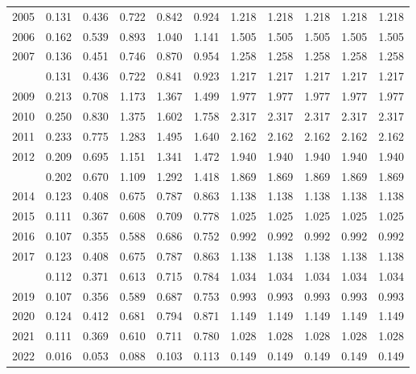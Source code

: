 \documentclass[
]{article}
\begin{document}
\begin{longtable}[t]{lrrrrrrrrrr}
2005 & 0.131 & 0.436 & 0.722 & 0.842 & 0.924 & 1.218 & 1.218 & 1.218 & 1.218 & 1.218\\
2006 & 0.162 & 0.539 & 0.893 & 1.040 & 1.141 & 1.505 & 1.505 & 1.505 & 1.505 & 1.505\\
2007 & 0.136 & 0.451 & 0.746 & 0.870 & 0.954 & 1.258 & 1.258 & 1.258 & 1.258 & 1.258\\
\addlinespace
2008 & 0.131 & 0.436 & 0.722 & 0.841 & 0.923 & 1.217 & 1.217 & 1.217 & 1.217 & 1.217\\
2009 & 0.213 & 0.708 & 1.173 & 1.367 & 1.499 & 1.977 & 1.977 & 1.977 & 1.977 & 1.977\\
2010 & 0.250 & 0.830 & 1.375 & 1.602 & 1.758 & 2.317 & 2.317 & 2.317 & 2.317 & 2.317\\
2011 & 0.233 & 0.775 & 1.283 & 1.495 & 1.640 & 2.162 & 2.162 & 2.162 & 2.162 & 2.162\\
2012 & 0.209 & 0.695 & 1.151 & 1.341 & 1.472 & 1.940 & 1.940 & 1.940 & 1.940 & 1.940\\
\addlinespace
2013 & 0.202 & 0.670 & 1.109 & 1.292 & 1.418 & 1.869 & 1.869 & 1.869 & 1.869 & 1.869\\
2014 & 0.123 & 0.408 & 0.675 & 0.787 & 0.863 & 1.138 & 1.138 & 1.138 & 1.138 & 1.138\\
2015 & 0.111 & 0.367 & 0.608 & 0.709 & 0.778 & 1.025 & 1.025 & 1.025 & 1.025 & 1.025\\
2016 & 0.107 & 0.355 & 0.588 & 0.686 & 0.752 & 0.992 & 0.992 & 0.992 & 0.992 & 0.992\\
2017 & 0.123 & 0.408 & 0.675 & 0.787 & 0.863 & 1.138 & 1.138 & 1.138 & 1.138 & 1.138\\
\addlinespace
2018 & 0.112 & 0.371 & 0.613 & 0.715 & 0.784 & 1.034 & 1.034 & 1.034 & 1.034 & 1.034\\
2019 & 0.107 & 0.356 & 0.589 & 0.687 & 0.753 & 0.993 & 0.993 & 0.993 & 0.993 & 0.993\\
2020 & 0.124 & 0.412 & 0.681 & 0.794 & 0.871 & 1.149 & 1.149 & 1.149 & 1.149 & 1.149\\
2021 & 0.111 & 0.369 & 0.610 & 0.711 & 0.780 & 1.028 & 1.028 & 1.028 & 1.028 & 1.028\\
2022 & 0.016 & 0.053 & 0.088 & 0.103 & 0.113 & 0.149 & 0.149 & 0.149 & 0.149 & 0.149\\*
\end{longtable}
\end{document}
